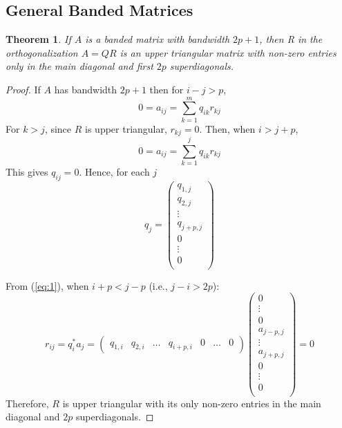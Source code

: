 \documentclass{article}
\numberwithin{pic}{section}
\numberwithin{lem}{section}
\newtheorem{thm}{Theorem}
\numberwithin{thm}{section}
\numberwithin{cor}{section}
\theoremstyle{definition}
\numberwithin{ex}{section}
\numberwithin{defn}{section}
\theoremstyle{definition}
\theoremstyle{remark}
\begin{document}
\subsection{General Banded Matrices}
\begin{thm}
	If $A$ is a banded matrix with bandwidth $2p + 1$, then R in the orthogonalization $A=QR$ is an upper triangular matrix with non-zero entries only in the main diagonal and first $2p$ superdiagonals.
\end{thm}
\begin{proof} If $A$ has bandwidth $2p +1$ then for $i - j > p$, 
	$$ 0 = a_{ij} = \sum_{k = 1}^{m} q_{ik}r_{kj}$$
For $k > j$, since $R$ is upper triangular, $r_{kj} = 0$. Then, when $i > j + p$,
	$$ 0 = a_{ij} = \sum_{k = 1}^{j} q_{ik}r_{kj}$$
This gives $q_{ij} = 0$. Hence, for each $j$
	\begin{equation} \label{eq:1}
		q_{j} = \begin{pmatrix} 
			q_{1,j} \\
			q_{2,j} \\
			\vdots \\
			q_{j+p,j} \\
			0 \\
			\vdots \\
			0 \\
		\end{pmatrix}
	\end{equation}

From (\ref{eq:1}), when $i+p < j - p $ (i.e., $j - i > 2p$):
	$$
		r_{ij} = q_i^* a_j =\begin{pmatrix}
			q_{1,i} & q_{2,i} &	\dots & q_{i+p,i} & 0 & \dots &	0 
		\end{pmatrix}\begin{pmatrix} 
		0 \\
		\vdots \\
		0 \\
		a_{j-p,j} \\
		\vdots \\
		a_{j+p,j} \\
		0 \\
		\vdots \\
		0 \\
		\end{pmatrix} = 0
	$$
Therefore, $R$ is upper triangular with its only non-zero entries in the main diagonal and $2p$ superdiagonals.
\end{proof}
\end{document}
